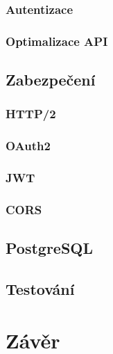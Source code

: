 \documentclass[a4paper,11pt,titlepage,fleqn]{article}
\begin{document}
        \subsubsection{Autentizace}

        \subsubsection{Optimalizace API}

    \subsection{Zabezpečení}

        \subsubsection{HTTP/2}

        \subsubsection{OAuth2}

        \subsubsection{JWT}

        \subsubsection{CORS}

    \subsection{PostgreSQL}

    \subsection{Testování}


\newpage
\section{Závěr}
\end{document}
